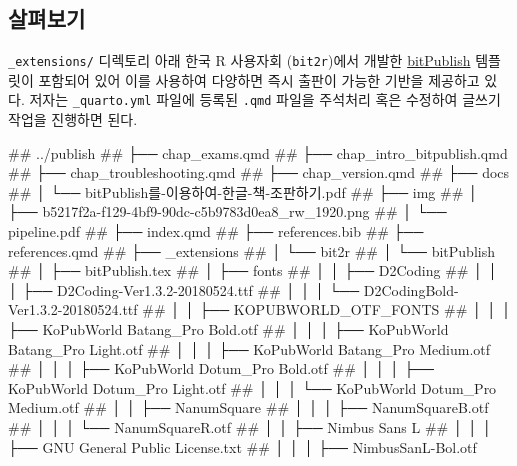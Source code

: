 \documentclass[
  letterpaper,
]{book}
\newenvironment{Shaded}{\begin{snugshade}}{\end{snugshade}}
\newcommand{\CommentTok}[1]{\textcolor[rgb]{0.37,0.37,0.37}{#1}}
\begin{document}
\hypertarget{uxc0b4uxd3b4uxbcf4uxae30}{%
\subsection{살펴보기}\label{uxc0b4uxd3b4uxbcf4uxae30}}

\texttt{\_extensions/} 디렉토리 아래 한국 R 사용자회
(\texttt{bit2r})에서 개발한
\href{https://github.com/bit2r/bitPublish}{bitPublish} 템플릿이 포함되어
있어 이를 사용하여 다양하면 즉시 출판이 가능한 기반을 제공하고 있다.
저자는 \texttt{\_quarto.yml} 파일에 등록된 \texttt{.qmd} 파일을 주석처리
혹은 수정하여 글쓰기 작업을 진행하면 된다.

\begin{Shaded}
\begin{Highlighting}[]
\CommentTok{\#\# ../publish}
\CommentTok{\#\# ├── chap\_exams.qmd}
\CommentTok{\#\# ├── chap\_intro\_bitpublish.qmd}
\CommentTok{\#\# ├── chap\_troubleshooting.qmd}
\CommentTok{\#\# ├── chap\_version.qmd}
\CommentTok{\#\# ├── docs}
\CommentTok{\#\# │   └── bitPublish를{-}이용하여{-}한글{-}책{-}조판하기.pdf}
\CommentTok{\#\# ├── img}
\CommentTok{\#\# │   ├── b5217f2a{-}f129{-}4bf9{-}90dc{-}c5b9783d0ea8\_rw\_1920.png}
\CommentTok{\#\# │   └── pipeline.pdf}
\CommentTok{\#\# ├── index.qmd}
\CommentTok{\#\# ├── references.bib}
\CommentTok{\#\# ├── references.qmd}
\CommentTok{\#\# ├── \_extensions}
\CommentTok{\#\# │   └── bit2r}
\CommentTok{\#\# │       └── bitPublish}
\CommentTok{\#\# │           ├── bitPublish.tex}
\CommentTok{\#\# │           ├── fonts}
\CommentTok{\#\# │           │   ├── D2Coding}
\CommentTok{\#\# │           │   │   ├── D2Coding{-}Ver1.3.2{-}20180524.ttf}
\CommentTok{\#\# │           │   │   └── D2CodingBold{-}Ver1.3.2{-}20180524.ttf}
\CommentTok{\#\# │           │   ├── KOPUBWORLD\_OTF\_FONTS}
\CommentTok{\#\# │           │   │   ├── KoPubWorld Batang\_Pro Bold.otf}
\CommentTok{\#\# │           │   │   ├── KoPubWorld Batang\_Pro Light.otf}
\CommentTok{\#\# │           │   │   ├── KoPubWorld Batang\_Pro Medium.otf}
\CommentTok{\#\# │           │   │   ├── KoPubWorld Dotum\_Pro Bold.otf}
\CommentTok{\#\# │           │   │   ├── KoPubWorld Dotum\_Pro Light.otf}
\CommentTok{\#\# │           │   │   └── KoPubWorld Dotum\_Pro Medium.otf}
\CommentTok{\#\# │           │   ├── NanumSquare}
\CommentTok{\#\# │           │   │   ├── NanumSquareB.otf}
\CommentTok{\#\# │           │   │   └── NanumSquareR.otf}
\CommentTok{\#\# │           │   ├── Nimbus Sans L}
\CommentTok{\#\# │           │   │   ├── GNU General Public License.txt}
\CommentTok{\#\# │           │   │   ├── NimbusSanL{-}Bol.otf}

\end{Highlighting}
\end{Shaded}
\end{document}
